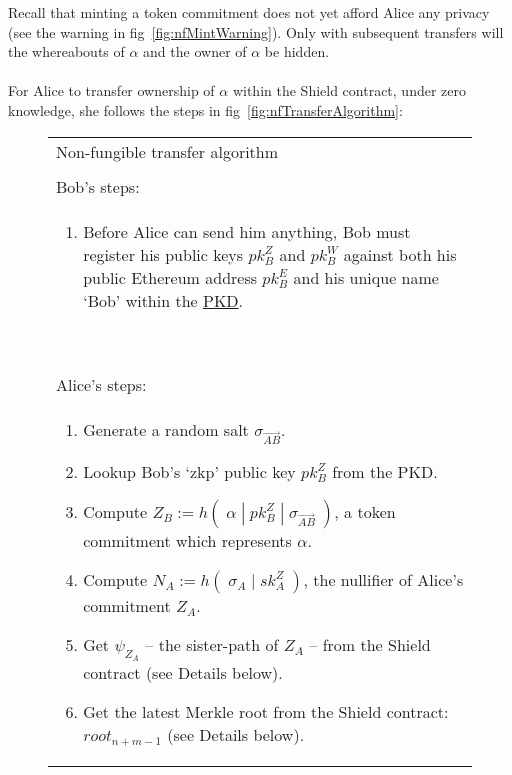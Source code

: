 \documentclass{article}
\newcounter{ongoingEnumCounter}%
\begin{document}
\noindent
Recall that minting a token commitment does not yet afford Alice any privacy (see the warning in fig~\ref{fig:nfMintWarning}). Only with subsequent transfers will the whereabouts of $\alpha$ and the owner of $\alpha$ be hidden.\\
\\




For Alice to transfer ownership of $\alpha$ within the Shield contract, under zero knowledge, she follows the steps in fig~\ref{fig:nfTransferAlgorithm}:

\newpage
\begin{figure}[H]
  \ContinuedFloat*
	\begin{center}
		\begin{framed}
      \begin{tabular}{p{16cm}}
        Non-fungible transfer algorithm \\
        \\
        \hline
        Bob's steps:\\
        \begin{enumerate}
          \item Before Alice can send him anything, Bob must register his public keys $pk_B^Z$ and $pk_B^W$ against both his public Ethereum address $pk_B^E$ and his unique name `Bob' within the \hyperref[sec:pkd]{PKD}.
          \setcounter{ongoingEnumCounter}{\value{enumi}}
        \end{enumerate}
        \ \\
        \hline
        Alice's steps:\\
        \begin{enumerate}
          \setcounter{enumi}{\value{ongoingEnumCounter}}
          \item Generate a random salt $\sigma_{\vec{AB}}$.
          \item Lookup Bob's `zkp' public key $pk_B^Z$ from the PKD.
          \item Compute $Z_B := h(\;\alpha\;|\;pk^Z_B\;|\;\sigma_{\vec{AB}}\;)$, a token commitment which represents $\alpha$.
          \item Compute $N_A := h(\;\sigma_{A}\;|\;sk^Z_A\;)$, the nullifier of Alice's commitment $Z_A$.
          \item Get $\psi_{Z_A}$ -- the sister-path of $Z_A$ -- from the Shield contract (see Details below).
          \item Get the latest Merkle root from the Shield contract: $root_{n+m-1}$ (see Details below).

\end{enumerate}
\end{tabular}
\end{framed}
\end{center}
\end{figure}
\end{document}
